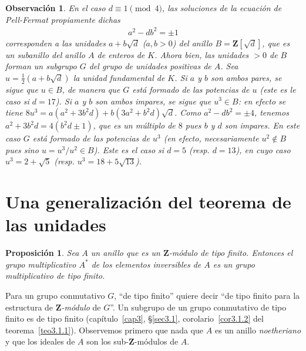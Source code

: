 \documentclass[oneside,bibtotoc,leqno,spanish]{amsbook}
\newcommand{\ZZ}{\mathbf{Z}}
\numberwithin{equation}{section}
\newenvironment{comm}%
	{\begin{trivlist}\item\small\itshape}
	{\end{trivlist}}
\theoremstyle{defi}
\theoremstyle{note}
\newtheorem{proposition}{Proposici\'on}
\theoremstyle{rem}
\newtheorem*{remark*}{Observaci\'on}
\numberwithin{theorem}{section}
\numberwithin{proposition}{section}
\numberwithin{definition}{section}
\numberwithin{lemma}{section}
\numberwithin{corollary}{section}
\numberwithin{example}{section}
\numberwithin{footnote}{section}%
\begin{document}
\begin{remark*}
En el caso $d\equiv 1\pmod 4$, las soluciones de la ecuaci\'on de Pell-Fermat propiamente dichas
\begin{gather}
a^{2}-db^{2}=\pm 1
\end{gather}
corresponden a las unidades $a+b\sqrt{d}$ ($a,b>0$) del anillo $B=\ZZ[\sqrt{d}]$, que es un subanillo
del anillo $A$ de enteros de $K$. Ahora bien, las unidades $>0$ de $B$ forman un subgrupo $G$ del grupo de
unidades positivas de $A$. Sea $u=\frac{1}{2}(a+b\sqrt{d})$ la unidad fundamental de $K$. Si $a$ y $b$ son
ambos {\em pares,} se sigue que $u\in B$, de manera que $G$ {\em est\'a formado de las potencias de $u$} (este
es le caso si $d=17$). Si $a$ y $b$ son ambos {\em impares, se sigue que $u^{3}\in B$:} en efecto se
tiene $8u^{3}=a(a^{2}+3b^{2}d)+b(3a^{2}+b^{2}d)\sqrt{d}$. Como $a^{2}-db^{2}=\pm 4$, tenemos
$a^{2}+3b^{2}d=4(b^{2}d\pm 1)$, que es un m\'ultiplo de $8$ pues $b$ y $d$ son impares. En este caso $G$
{\em est\'a formado de las potencias de $u^{3}$} (en efecto, necesariamente $u^{2}\notin B$ pues sino
$u=u^{3}/u^{2}\in B$). Este es el caso si $d=5$ (resp. $d=13$), en cuyo caso $u^{3}=2+\sqrt{5}$
(resp. $u^{3}=18+5\sqrt{13}$).
\end{remark*}

\section{Una generalizaci\'on del teorema de las unidades}

\begin{proposition}
Sea $A$ un anillo que es un $\ZZ$-m\'odulo de tipo finito. Entonces el grupo multiplicativo
$A^{*}$ de los elementos inversibles de $A$ es un grupo multiplicativo de tipo finito.
\end{proposition}

Para un grupo conmutativo $G$, ``de tipo finito'' quiere decir ``de tipo finito para la estructura
de {\em $\ZZ$-m\'odulo} de $G$''. Un subgrupo de un grupo conmutativo de tipo finito es de tipo finito
(cap\'itulo~\ref{cap3}, \S\ref{sec3.1}, corolario~\ref{cor3.1.2} del teorema~\ref{teo3.1.1}).
Observemos primero que nada que $A$ es un anillo {\em noetheriano}
y que los ideales de $A$ son los sub-$\ZZ$-m\'odulos de $A$.
\end{document}
